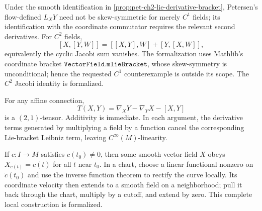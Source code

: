 \begin{remark}
  \label{rem:pet-ch2-ex-2}


  Under the smooth identification in
  \cref{prop:pet-ch2-lie-derivative-bracket}, Petersen's flow-defined $L_XY$ need not be
  skew-symmetric for merely $C^1$ fields; its identification with the coordinate
  commutator requires the relevant second derivatives. For $C^2$ fields,
  \[
    [X,[Y,W]]=[[X,Y],W]+[Y,[X,W]],
  \]
  equivalently the cyclic Jacobi sum vanishes.
  The formalization uses Mathlib's coordinate bracket
  $\texttt{VectorField.mlieBracket}$, whose skew-symmetry is unconditional;
  hence the requested $C^1$ counterexample is outside its scope. The $C^2$
  Jacobi identity is formalized.
\end{remark}

\begin{remark}
  \label{rem:pet-ch2-ex-3}


  For any affine connection,
  \[
    T(X,Y)=\nabla_XY-\nabla_YX-[X,Y]
  \]
  is a $(2,1)$-tensor.
  \sketch
  Additivity is immediate. In each argument, the derivative terms generated
  by multiplying a field by a function cancel the corresponding Lie-bracket
  Leibniz term, leaving $C^\infty(M)$-linearity.
\end{remark}

\begin{remark}
  \label{rem:pet-ch2-ex-4}


  If $c:I\to M$ satisfies
  $\dot c(t_0)\ne0$, then some smooth vector field $X$ obeys
  $X_{c(t)}=\dot c(t)$ for all $t$ near $t_0$.
  \sketch
  In a chart, choose a linear functional nonzero on $\dot c(t_0)$ and use the
  inverse function theorem to rectify the curve locally. Its coordinate
  velocity then extends to a smooth field on a neighborhood; pull it back
  through the chart, multiply by a cutoff, and extend by zero. This complete
  local construction is formalized.
\end{remark}

